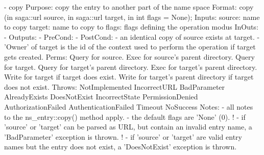 \begin{myspec}
    - copy
      Purpose:  copy the entry to another part of the name space
      Format:   copy               (in  saga::url  source,
                                    in  saga::url  target,
                                    in  int     flags = None);
      Inputs:   source:             name to copy
                target:             name to copy to
                flags:              flags defining the operation
                                    modus
      InOuts:   -
      Outputs:  -
      PreCond:  -
      PostCond: - an identical copy of source exists at target.
                - 'Owner' of target is the id of the context
                  used to perform the operation if target gets
                  created.
      Perms:    Query for source.
                Exec  for source's parent directory.
                Query for target.
                Query for target's parent directory.
                Exec  for target's parent directory.
                Write for target
                      if  target does exist.
                Write for target's parent directory 
                      if  target does not exist.
      Throws:   NotImplemented
                IncorrectURL
                BadParameter
                AlreadyExists
                DoesNotExist
                IncorrectState
                PermissionDenied
                AuthorizationFailed
                AuthenticationFailed
                Timeout
                NoSuccess
      Notes:    - all notes to the ns_entry::copy() method
                  apply.
                - the default flags are 'None' (0).
!               - if 'source' or 'target' can be parsed as URL, 
                  but contain an invalid entry name, a 
                  'BadParameter' exception is thrown.
!               - if 'source' or 'target' are valid entry names 
                  but the entry does not exist, a 'DoesNotExist'
                  exception is thrown.
 

\end{myspec}

